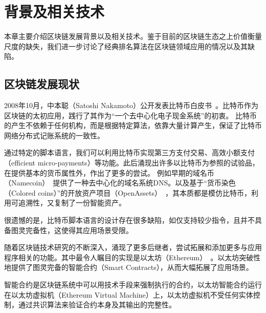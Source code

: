
\section{背景及相关技术}


本章主要介绍区块链发展背景以及相关技术。鉴于目前的区块链生态之上价值衡量尺度的缺失，我们进一步讨论了经典排名算法在区块链领域应用的情况以及其缺陷。

\subsection{区块链发展现状}


2008年10月，中本聪（Satoshi Nakamoto）公开发表比特币白皮书~\cite{Nakamoto2008}。比特币作为区块链的太初应用，践行了其作为“一个去中心化电子现金系统”的初衷。 比特币的产生不依赖于任何机构，而是根据特定算法，依靠大量计算产生，保证了比特币网络分布式记账系统的一致性。

通过特定的脚本语言，我们可以利用比特币实现第三方支付交易、高效小额支付（efficient micro-payments）等功能。此后涌现出许多以比特币为参照的试验品，在提供基本的货币属性外，作出了更多的尝试。
例如早期的域名币（Namecoin）~\cite{Namecoin}提供了一种去中心化的域名系统DNS。以及基于“货币染色（Colored coins）”的开放资产项目（OpenAssets）~\cite{OpenAssets}，其本质都是模仿比特币，利用可追溯性，又复制了一份智能资产。


很遗憾的是，比特币脚本语言的设计存在很多缺陷，如仅支持较少指令，且并不具备图灵完备性，这使得其应用场景受限。

随着区块链技术研究的不断深入，涌现了更多后继者，尝试拓展和添加更多与应用程序相关的功能。其中最令人瞩目的实现是以太坊（Ethereum）~\cite{buterin2013ethereum}。以太坊突破性地提供了图灵完备的智能合约（Smart Contracts），从而大幅拓展了应用场景。

智能合约是区块链系统中可以用技术手段来强制执行的合约，以太坊智能合约运行在以太坊虚拟机（Ethereum Virtual Machine）上，以太坊虚拟机不受任何实体控制，通过共识算法来验证合约本身及其输出的完整性。

